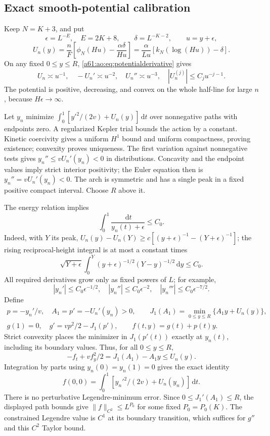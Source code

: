 \documentclass[11pt,letterpaper]{article}
\numberwithin{equation}{section}
\theoremstyle{remark}\newtheorem{remark}[theorem]{Remark}
\newcommand{\dd}{\,\mathrm d}
\begin{document}
\subsection{Exact smooth-potential calibration}
Keep $N=K+3$, and put
\[
 \epsilon=L^{-E},\quad E=2K+8,\qquad
 \delta=L^{-K-2},\qquad u=y+\epsilon,
\]
\begin{equation}\label{a61:ao:eq:softpotential}
 U_n(y)=\frac nF\left[\phi_N(Hu)-\frac{\alpha\delta}{Hu}\right]
 =\frac{\alpha}{Lu}[k_N(\log(Hu))-\delta].
\end{equation}
On any fixed $0\le y\le R$, \eqref{a61:ao:eq:potentialderivative} gives
\[
 U_n\asymp u^{-1},\quad -U_n'\asymp u^{-2},\quad
 U_n''\asymp u^{-3},\quad |U_n^{(j)}|\le C_ju^{-j-1}.
\]
The potential is positive, decreasing, and convex on the whole
half-line for large $n$, because $H\epsilon\to\infty$.

Let $y_n$ minimize
$\int_0^1[y'^2/(2v)+U_n(y)]\dd t$ over nonnegative paths with
endpoints zero. A regularized Kepler trial bounds the action by a
constant. Kinetic coercivity gives a uniform $H^1$ bound and uniform
compactness, proving existence; convexity proves uniqueness. The
first variation against nonnegative tests gives
$y_n''\le vU_n'(y_n)<0$ in distributions. Concavity and the endpoint
values imply strict interior positivity; the Euler equation then is
$y_n''=vU_n'(y_n)<0$. The arch is symmetric and has a single peak in
a fixed positive compact interval. Choose $R$ above it.

The energy relation implies
\begin{equation}\label{a61:ao:eq:softreciprocal}
 \int_0^1\frac{\dd t}{y_n(t)+\epsilon}\le C_0.
\end{equation}
Indeed, with $Y$ its peak,
$U_n(y)-U_n(Y)\ge c[(y+\epsilon)^{-1}-(Y+\epsilon)^{-1}]$;
the rising reciprocal-height integral is at most a constant times
\[
 \sqrt{Y+\epsilon}\int_0^Y
 (y+\epsilon)^{-1/2}(Y-y)^{-1/2}\dd y\le C_0.
\]
All required derivatives grow only as fixed powers of $L$; for example,
\[
 |y_n'|\le C_0\epsilon^{-1/2},\quad
 |y_n''|\le C_0\epsilon^{-2},\quad
 |y_n'''|\le C_0\epsilon^{-7/2}.
\]
Define
\begin{gather*}
 p=-y_n'/v,\quad A_1=p'=-U_n'(y_n)>0,\qquad
 J_1(A_1)=\min_{0\le y\le R}\{A_1y+U_n(y)\},\\
 g(1)=0,\quad g'=vp^2/2-J_1(p'),\qquad
 f(t,y)=g(t)+p(t)y.
\end{gather*}
Strict convexity places the minimizer in $J_1(p'(t))$ exactly at
$y_n(t)$, including its boundary values. Thus, for all $0\le y\le R$,
\begin{equation}\label{a61:ao:eq:HJ}
 -f_t+vf_y^2/2=J_1(A_1)-A_1y\le U_n(y).
\end{equation}
Integration by parts using $y_n(0)=y_n(1)=0$ gives the exact identity
\begin{equation}\label{a61:ao:eq:calibrationvalue}
 f(0,0)=\int_0^1[y_n'^2/(2v)+U_n(y_n)]\dd t.
\end{equation}
There is no perturbative Legendre-minimum error. Since
$0\le J_1'(A_1)\le R$, the displayed path bounds give
$\|f\|_{C^2}\le L^{P_0}$ for some fixed $P_0=P_0(K)$. The constrained
Legendre value is $C^1$ at its boundary transition, which suffices
for $g''$ and this $C^2$ Taylor bound.
\end{document}
